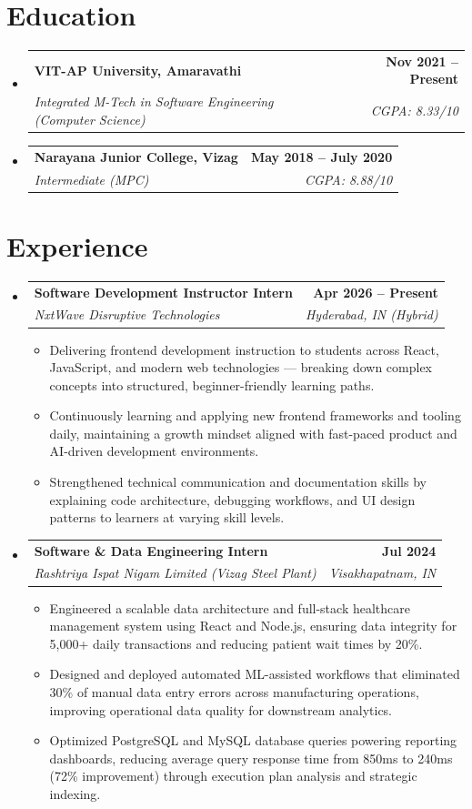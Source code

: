 \documentclass[letterpaper,11pt]{article}
\makeatletter
\newcommand{\resumeItem}[1]{\item\small{{#1 \vspace{-2pt}}}}
\newcommand{\resumeSubheading}[4]{
	\vspace{-2pt}\item
	\begin{tabular*}{1.0\textwidth}[t]{l@{\extracolsep{\fill}}r}
		\textbf{#1} & \textbf{\small #2} \\
		\textit{\small#3} & \textit{\small #4} \\
	\end{tabular*}\vspace{-7pt}
}
\newcommand{\resumeItemListStart}{\begin{itemize}}
\newcommand{\resumeItemListEnd}{\end{itemize}\vspace{-5pt}}
\newcommand{\resumeSubHeadingListStart}{\begin{itemize}[leftmargin=0.0in, label={}]}
\newcommand{\resumeSubHeadingListEnd}{\end{itemize}}
\makeatother
\begin{document}
\section{Education}
\resumeSubHeadingListStart
\resumeSubheading
{VIT-AP University, Amaravathi}{Nov 2021 -- Present}
{Integrated M-Tech in Software Engineering (Computer Science)}{CGPA: 8.33/10}
\resumeSubheading
{Narayana Junior College, Vizag}{May 2018 -- July 2020}
{Intermediate (MPC)}{CGPA: 8.88/10}
\resumeSubHeadingListEnd

\section{Experience}
\resumeSubHeadingListStart

\resumeSubheading
{Software Development Instructor Intern}{Apr 2026 -- Present}
{NxtWave Disruptive Technologies}{Hyderabad, IN (Hybrid)}
\resumeItemListStart
\resumeItem{Delivering frontend development instruction to students across React, JavaScript, and modern web technologies — breaking down complex concepts into structured, beginner-friendly learning paths.}
\resumeItem{Continuously learning and applying new frontend frameworks and tooling daily, maintaining a growth mindset aligned with fast-paced product and AI-driven development environments.}
\resumeItem{Strengthened technical communication and documentation skills by explaining code architecture, debugging workflows, and UI design patterns to learners at varying skill levels.}
\resumeItemListEnd

\resumeSubheading
{Software \& Data Engineering Intern}{Jul 2024}
{Rashtriya Ispat Nigam Limited (Vizag Steel Plant)}{Visakhapatnam, IN}
\resumeItemListStart
\resumeItem{Engineered a scalable data architecture and full-stack healthcare management system using React and Node.js, ensuring data integrity for 5,000+ daily transactions and reducing patient wait times by 20\%.}
\resumeItem{Designed and deployed automated ML-assisted workflows that eliminated 30\% of manual data entry errors across manufacturing operations, improving operational data quality for downstream analytics.}
\resumeItem{Optimized PostgreSQL and MySQL database queries powering reporting dashboards, reducing average query response time from 850ms to 240ms (72\% improvement) through execution plan analysis and strategic indexing.}
\resumeItemListEnd

\resumeSubHeadingListEnd
\vspace{-15pt}
\end{document}
